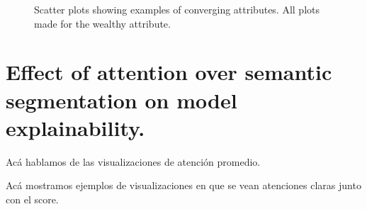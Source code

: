 \begin{figure}[ht]
	\centering
	\hspace{0mm}
	\caption{
		Scatter plots showing examples of converging attributes. All plots made
		for the wealthy attribute.
	}
	\label{fig:scatters}
\end{figure}

\section{Effect of attention over semantic segmentation on model explainability.}
Acá hablamos de las visualizaciones de atención promedio.

Acá mostramos ejemplos de visualizaciones en que se vean atenciones claras junto con el score.